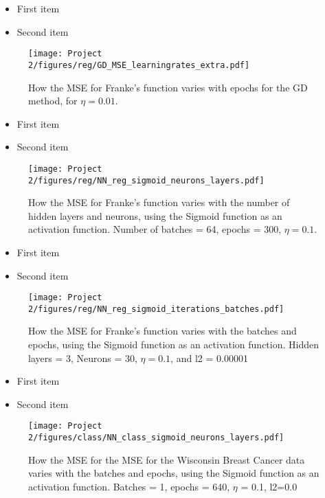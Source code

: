 \documentclass[english,notitlepage,reprint,nofootinbib]{revtex4-2}  %
\begin{document}
\begin{itemize}
\color{white}
\item First item
\item Second item
\end{itemize}

\begin{figure}[h!]
    \centering %
    \texttt{[image: Project 2/figures/reg/GD\_MSE\_learningrates\_extra.pdf]} 
    \caption{How the MSE for Franke's function varies with epochs for the GD method, for $\eta=0.01$.}
    \label{fig: extra1}
\end{figure}

\begin{itemize}
\color{white}
\item First item
\item Second item
\end{itemize}

\begin{figure}[h!]
    \centering %
    \texttt{[image: Project 2/figures/reg/NN\_reg\_sigmoid\_neurons\_layers.pdf]} 
    \caption{How the MSE for Franke's function varies with the number of hidden layers and neurons, using the Sigmoid function as an activation function. 
    Number of batches = 64, epochs = 300,  $\eta=0.1$.
    }
    \label{fig: b_sigmoid_1}
\end{figure}

\begin{itemize}
\color{white}
\item First item
\item Second item
\end{itemize}

\begin{figure}[h!]
    \centering %
    \texttt{[image: Project 2/figures/reg/NN\_reg\_sigmoid\_iterations\_batches.pdf]} 
    \caption{How the MSE for Franke's function varies with the batches and epochs, using the Sigmoid function as an activation function. 
    Hidden layers = 3, Neurons = 30, $\eta=0.1$, and l2 = 0.00001}
    \label{fig: b_sigmoid_2}
\end{figure}


\begin{itemize}
\color{white}
\item First item
\item Second item
\end{itemize}


\begin{figure}[h!]
    \centering %
    \texttt{[image: Project 2/figures/class/NN\_class\_sigmoid\_neurons\_layers.pdf]} 
    \caption{How the MSE for the MSE for the Wisconsin Breast Cancer data varies with the batches and epochs, using the Sigmoid function as an activation function. Batches = 1, epochs = 640, $\eta$ = 0.1, l2=0.0
    }
    \label{fig: nn_neuron_layer}
\end{figure}
\end{document}
